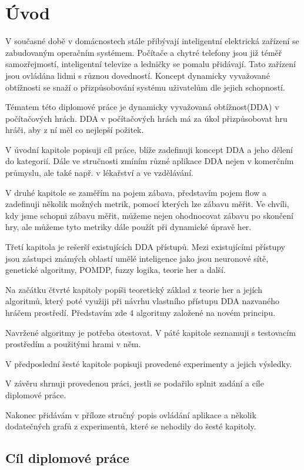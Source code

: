 \chapter{Úvod}

V současné době v domácnostech stále přibývají inteligentní elektrická zařízení se zabudovaným operačním systémem. Počítače a chytré telefony jsou již téměř samozřejmostí, inteligentní televize a ledničky se pomalu přidávají. Tato zařízení jsou ovládána lidmi s různou dovedností. Koncept dynamicky vyvažované obtížnosti se snaží o přizpůsobování systému uživatelům dle jejich schopností.

Tématem této diplomové práce je dynamicky vyvažovaná obtížnost(DDA) v počítačových hrách. DDA v počítačových hrách má za úkol přizpůsobovat hru hráči, aby z ní měl co nejlepší požitek. 

V úvodní kapitole popisuji cíl práce, blíže zadefinuji koncept DDA a jeho dělení do kategorií. Dále ve stručnosti zmíním různé aplikace DDA nejen v komerčním průmyslu, ale také např. v lékařství a ve vzdělávání.

V druhé kapitole se zaměřím na pojem zábava, představím pojem flow a zadefinuji několik možných metrik, pomocí kterých lze zábavu měřit. Ve chvíli, kdy jsme schopni zábavu měřit, můžeme nejen ohodnocovat zábavu po skončení hry, ale můžeme tyto metriky dále použít při dynamické úpravě her.

Třetí kapitola je rešerší existujících DDA přístupů. Mezi existujícími přístupy jsou zástupci známých oblastí umělé inteligence jako jsou neuronové sítě, genetické algoritmy, POMDP, fuzzy logika, teorie her a další.

Na začátku čtvrté kapitoly  popíši teoretický základ z teorie her a jejích algoritmů, který poté využiji při návrhu vlastního přístupu DDA nazvaného hráčem prostředí. Představím zde 4 algoritmy založené na novém principu.

Navržené algoritmy je potřeba otestovat. V páté kapitole seznamuji s testovacím prostředím a použitými hrami v něm.

V předposlední šesté kapitole popisuji provedené experimenty a jejich výsledky.

V závěru shrnuji provedenou práci, jestli se podařilo splnit zadání a cíle diplomové práce.

Nakonec přidávám v příloze stručný popis ovládání aplikace a několik dodatečných grafů z experimentů, které se nehodily do šesté kapitoly.

\section{Cíl diplomové práce}

